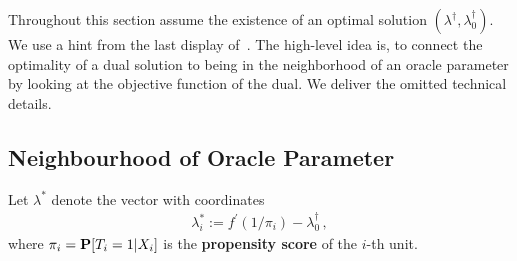 Throughout this section assume the existence of an 
optimal solution 
$(\lambda^\dagger,\lambda_0^\dagger)$.
We use a hint from the last display of~\cite[p.22]{Wang2019}.
The high-level idea is, 
to connect the optimality of a dual solution 
to 
being in the 
neighborhood of an oracle parameter
by looking at the objective function of the dual.
We deliver the omitted technical details.
\subsection*{Neighbourhood of Oracle Parameter}
Let $\lambda^*$ denote the vector with coordinates
\begin{gather}
  \lambda^*_i
  :=
  f^{'}(1/\pi_i)
  -
  \lambda^\dagger_0
  \,,
\end{gather}
where $\pi_i=\P[T_i=1|X_i]$ is the \textbf{propensity score} of the 
$i$-th unit.

